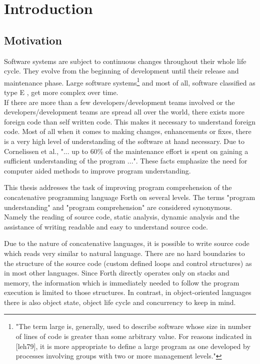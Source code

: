 \chapter{Introduction}

\section*{Motivation}

Software systems are subject to continuous changes throughout their whole life cycle.
They evolve from the beginning of development until their release and maintenance phase. Large software systems\footnote{"The term large is, generally, used to describe software whose size in number of lines of code is greater than some arbitrary value. For reasons indicated in [leh79], it is more appropriate to define a large program as one developed by processes involving groups with two or more management levels."\cite{Lehman:2003:SEB:950401.950407}} and most of all, software  classified as type E \cite{Cook:2006:ESS:1115566.1115567}, get more complex over time.\\
If there are more than a few developers/development teams involved or the developers/development teams are spread all over the world, there exists more foreign code than self written code. This makes it necessary to understand foreign code.
Most of all when it comes to making changes, enhancements or fixes, there is a very high level of understanding of the software at hand necessary\cite{Boehm:1976:SE:1311958.1312684}\cite{Singer97anexamination}. Due to Cornelissen et al., "... up to 60\% of the maintenance effort is spent on gaining a sufficient understanding of the program ..."\cite{Cornelissen:2009:SSP:1638616.1639301}. These facts emphasize the need for computer aided methods to improve program understanding.

This thesis addresses the task of improving program comprehension of the concatenative programming language Forth on several levels. The terms "program understanding" and "program comprehension" are considered synonymous. Namely the reading of source code, static analysis, dynamic analysis and the assistance of writing readable and easy to understand source code.

Due to the nature of concatenative languages, it is possible to write source code which reads very similar to natural language. There are no hard boundaries to the structure of the source code (custom defined loops and control structures) as in most other languages. Since Forth directly operates only on stacks and memory, the information which is immediately needed to follow the program execution is limited to those structures. In contrast, in object-oriented languages there is also object state, object life cycle and concurrency to keep in mind.

